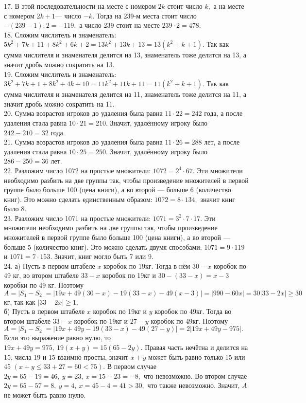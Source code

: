 17. В этой последовательности на месте с номером $2k$ стоит число $k,$ а на месте с номером $2k+1$--- число $-k.$ Тогда на 239-м места стоит число $-(239-1):2=-119,$ а число 239 стоит на месте $239\cdot2=478.$\\
18. Сложим числитель и знаменатель: $5k^2+7k+11+8k^2+6k+2=13k^2+13k+13=13(k^2+k+1).$ Так как сумма числителя и знаменателя делится на 13, знаменатель тоже делится на 13, а значит дробь можно сократить на 13.\\
19. Сложим числитель и знаменатель: $3k^2+7k+1+8k^2+4k+10=11k^2+11k+11=11(k^2+k+1).$ Так как сумма числителя и знаменателя делится на 11, знаменатель тоже делится на 11, а значит дробь можно сократить на 11.\\
20. Сумма возрастов игроков до удаления была равна $11\cdot22=242$ года, а после удаления стала равна $10\cdot21=210.$ Значит, удалённому игроку было $242-210=32$ года.\\
21. Сумма возрастов игроков до удаления была равна $11\cdot26=288$ лет, а после удаления стала равна $10\cdot25=250.$ Значит, удалённому игроку было $286-250=36$ лет.\\
22. Разложим число 1072 на простые множители: $1072=2^4\cdot67.$ Эти множители необходимо разбить на две группы так, чтобы произведение множителей в первой группе было больше 100 (цена книги), а во второй --- больше 6 (количество книг). Это можно сделать единственным образом: $1072=8\cdot134,$ значит книг было 8.\\
23. Разложим число 1071 на простые множители: $1071=3^2\cdot7\cdot17.$ Эти множители необходимо разбить на две группы так, чтобы произведение множителей в первой группе было больше 100 (цена книги), а во второй --- больше 5 (количество книг). Это можно сделать двумя способами: $1071=9\cdot119$ и $1071=7\cdot153.$ Значит, книг могло быть 7 или 9.\\
24. а) Пусть в первом штабеле $x$ коробок по 19кг. Тогда в нём $30-x$ коробок по 49 кг, во втором штабеле $33-x$ коробок по 19кг и $30-(33-x)=x-3$ коробки по 49 кг.
Поэтому $A=|S_1-S_2|=|19x+49(30-x)-19(33-x)-49(x-3)|=|990-60x|=30|33-2x|\geqslant30$кг, так как $|33-2x|\geqslant1.$\\
б) Пусть в первом штабеле $x$ коробок по 19кг и $y$ коробок по 49кг. Тогда во втором штабеле $33-x$ коробок по 19кг и $27-y$ коробок по 49кг. Поэтому
$A=|S_1-S_2|=|19x+49y-19(33-x)-49(27-y)|=2|19x+49y-975|.$ Если это выражение равно нулю, то $19x+49y=975,\ 19(x+y)=15(65-2y).$ Правая часть нечётна и делится на 15, числа 19 и 15 взаимно просты, значит $x+y$ может быть равно только 15 или 45 $(x+y\leqslant33+27=60<75).$ В первом случае $2y=65-19=46,\ y=23,\ x=15-23=-8,$ что невозможно. Во втором случае $2y=65-57=8,\ y=4,\ x=45-4=41>30,$ что также невозможно. Значит, $A$ не может быть равно нулю.\\
